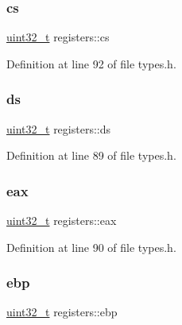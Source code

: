 \subsubsection{\texorpdfstring{cs}{cs}}
{\footnotesize\ttfamily \hyperlink{a00140_a435d1572bf3f880d55459d9805097f62_a435d1572bf3f880d55459d9805097f62}{uint32\+\_\+t} registers\+::cs}



Definition at line 92 of file types.\+h.

\mbox{\label{a00264_a806ec3ba0cf965d456601aea4c039ec3_a806ec3ba0cf965d456601aea4c039ec3}} 
\subsubsection{\texorpdfstring{ds}{ds}}
{\footnotesize\ttfamily \hyperlink{a00140_a435d1572bf3f880d55459d9805097f62_a435d1572bf3f880d55459d9805097f62}{uint32\+\_\+t} registers\+::ds}



Definition at line 89 of file types.\+h.

\mbox{\label{a00264_a1e01e806248cd98e55e0b053db6a6a51_a1e01e806248cd98e55e0b053db6a6a51}} 
\subsubsection{\texorpdfstring{eax}{eax}}
{\footnotesize\ttfamily \hyperlink{a00140_a435d1572bf3f880d55459d9805097f62_a435d1572bf3f880d55459d9805097f62}{uint32\+\_\+t} registers\+::eax}



Definition at line 90 of file types.\+h.

\mbox{\label{a00264_a8d156d1d27fcb1c2f2bbcce1a784431f_a8d156d1d27fcb1c2f2bbcce1a784431f}} 
\subsubsection{\texorpdfstring{ebp}{ebp}}
{\footnotesize\ttfamily \hyperlink{a00140_a435d1572bf3f880d55459d9805097f62_a435d1572bf3f880d55459d9805097f62}{uint32\+\_\+t} registers\+::ebp}



